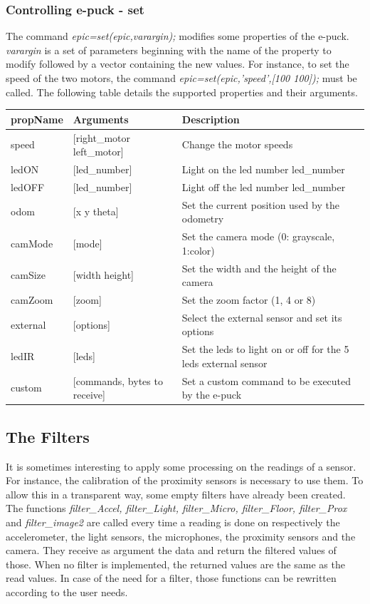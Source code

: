 \documentclass[11pt,oneside,english,a4paper]{article}
\begin{document}
\subsubsection{Controlling e-puck - set}
\par The command \emph{epic=set(epic,varargin);} modifies some properties of the e-puck. \emph{varargin} is a set of parameters beginning with the name of the property to modify followed by a vector containing the new values. For instance, to set the speed of the two motors, the command \emph{epic=set(epic,'speed',[100 100]);} must be called. The following table details the supported properties and their arguments.
\setlongtables
\begin{longtable}{|l|l|p{6.5cm}|}
\hline
\textbf{propName} & \textbf{Arguments} & \textbf{Description}\\
\hline \hline
speed & [right\_motor left\_motor] & Change the motor speeds\\
\hline
ledON & [led\_number] & Light on the led number led\_number\\
\hline
ledOFF & [led\_number] & Light off the led number led\_number\\
\hline
odom & [x y theta] & Set the current position used by the odometry\\
\hline
camMode & [mode] & Set the camera mode (0: grayscale, 1:color)\\
\hline
camSize & [width height] & Set the width and the height of the camera\\
\hline
camZoom & [zoom] & Set the zoom factor (1, 4 or 8)\\
\hline
external & [options] & Select the external sensor and set its options\\
\hline
ledIR & [leds] & Set the leds to light on or off for the 5 leds external sensor\\
\hline
custom & [commands, bytes to receive] & Set a custom command to be executed by the e-puck\\
\hline
\end{longtable}



\subsection{The Filters}
It is sometimes interesting to apply some processing on the readings of a sensor. For instance, the calibration of the proximity sensors is necessary to use them. To allow this in a transparent way, some empty filters have already been created. The functions \emph{filter\_Accel, filter\_Light, filter\_Micro, filter\_Floor, filter\_Prox} and \emph{filter\_image2} are called every time a reading is done on respectively the accelerometer, the light sensors, the microphones, the proximity sensors and the camera. They receive as argument the data and return the filtered values of those. When no filter is implemented, the returned values are the same as the read values. In case of the need for a filter, those functions can be rewritten according to the user needs.
\end{document}
